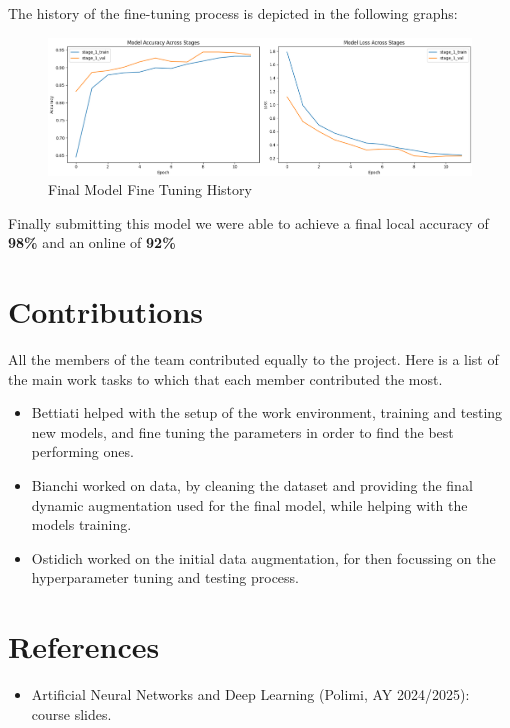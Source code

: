 \documentclass[11pt]{article}
\begin{document}
The history of the fine-tuning process is depicted in the following graphs:  
\begin{figure}[h!]
    \centering
    \includegraphics[width=\textwidth]{docs/images/final_model_history.png}
    \caption{Final Model Fine Tuning History}
\end{figure}

Finally submitting this model we were able to achieve a final local accuracy of \textbf{98\%} and an online of \textbf{92\%}

\section{Contributions}

All the members of the team contributed equally to the project. 
Here is a list of the main work tasks to which that each member contributed the most.

\begin{itemize}
    \item Bettiati helped with the setup of the work environment, training and testing new models, and fine tuning the parameters in order to find the best performing ones.
    \item Bianchi worked on data, by cleaning the dataset and providing the final dynamic augmentation used for the final model, while helping with the models training.
    \item Ostidich worked on the initial data augmentation, for then focussing on the hyperparameter tuning and testing process.
\end{itemize}

\section{References}

\begin{itemize}
    \item Artificial Neural Networks and Deep Learning (Polimi, AY 2024/2025): course slides.
\end{itemize}
\end{document}
